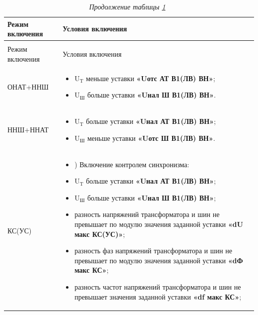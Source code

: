 \documentclass[a4paper, 12pt, table, hidelinks, DIV=calc]{extarticle}
\begin{document}
\begin{enumerate}[label=\arabic{section}.\arabic{subsection}.\arabic{subsubsection}.\arabic*,  align=left, labelsep=4pt, leftmargin=0pt, itemindent=57pt]
\small
\begin{longtable}{|>{\centering\arraybackslash}m{5.3cm}|>{\centering\arraybackslash}m{11.6cm}|}
\caption{Условия включения\hfill\vspace{-0.5\baselineskip}}\label{desc:tbl1}\\
\hline
\rowcolor{gray!30}
Режим включения & Условия включения \\
\hline
\endfirsthead

\caption*{\hspace{3pt}\emph{Продолжение таблицы \ref{desc:tbl1}}\hfill\ }\vspace{-0.5\baselineskip} \\
\hline
\rowcolor{gray!30}
Режим включения & Условия включения \\
\hline
\endhead

ОНАТ+ННШ &   
			\begin{itemize}
			\vspace{3pt}
			\item $ \textrm{U}_\textrm{T} $ меньше уставки \textbf{«Uотс АТ В1(ЛВ) ВН»};
			\item $ \textrm{U}_\textrm{Ш} $ больше уставки \textbf{«Uнал Ш В1(ЛВ) ВН»}.
			\vspace{3pt}
			\end{itemize} \\
\hline
ННШ+ННАТ & 
			\begin{itemize}
			\vspace{3pt}
			\item $ \textrm{U}_\textrm{T} $ больше уставки \textbf{«Uнал АТ В1(ЛВ) ВН»};
			\item $ \textrm{U}_\textrm{Ш} $ меньше уставки \textbf{«Uотс Ш В1(ЛВ) ВН»}.
			\vspace{3pt}
			\end{itemize} \\
\hline
КС(УС)	&
			\vspace{3pt}
			
			\begin{itemize}
			\item[] \noindent 1) Включение контролем синхронизма:
			\item $ \textrm{U}_\textrm{T} $ больше уставки \textbf{«Uнал АТ В1(ЛВ) ВН»};
			\item $ \textrm{U}_\textrm{Ш} $ больше уставки \textbf{«Uнал Ш В1(ЛВ) ВН»};
			\item разность напряжений трансформатора и шин не превышает по модулю значения заданной уставки \textbf{«dU макс КС(УС)»};
			\item разность фаз напряжений трансформатора и шин не превышает по модулю значения заданной уставки \textbf{«dФ макс КС»};
			\item разность частот напряжений трансформатора и шин не превышает значения заданной уставки \textbf{«df макс КС»};
			\end{itemize}
			

\end{longtable}
\end{enumerate}
\end{document}
